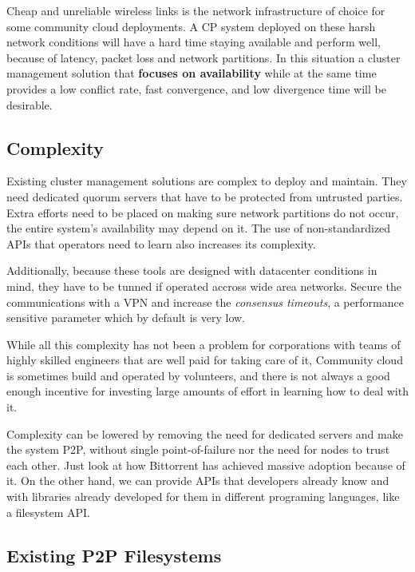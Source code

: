 \documentclass{sig-alternate}
\begin{document}
Cheap and unreliable wireless links is the network infrastructure of choice for some community cloud deployments. A CP system deployed on these harsh network conditions will have a hard time staying available and perform well, because of latency, packet loss and network partitions. In this situation a cluster management solution that \textbf{focuses on availability} while at the same time provides a low conflict rate, fast convergence, and low divergence time will be desirable.


\subsection{Complexity}

Existing cluster management solutions are complex to deploy and maintain. They need dedicated quorum servers that have to be protected from untrusted parties. Extra efforts need to be placed on making sure network partitions do not occur, the entire system's availability may depend on it. The use of non-standardized APIs that operators need to learn also increases its complexity.

Additionally, because these tools are designed with datacenter conditions in mind, they have to be tunned if operated accross wide area networks. Secure the communications with a VPN and increase the \textit{consensus timeouts}, a performance sensitive parameter which by default is very low.

While all this complexity has not been a problem for corporations with teams of highly skilled engineers that are well paid for taking care of it, Community cloud is sometimes build and operated by volunteers, and there is not always a good enough incentive for investing large amounts of effort in learning how to deal with it.

Complexity can be lowered by removing the need for dedicated servers and make the system P2P, without single point-of-failure nor the need for nodes to trust each other. Just look at how Bittorrent has achieved massive adoption because of it. On the other hand, we can provide APIs that developers already know and with libraries already developed for them in different programing languages, like a filesystem API.


\subsection{Existing P2P Filesystems}
\end{document}
